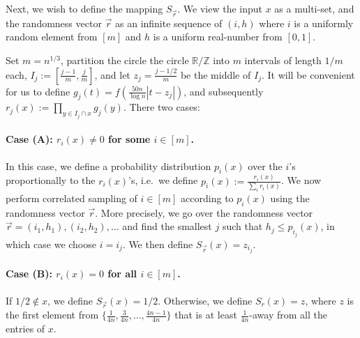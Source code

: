\documentclass[10pt,a4paper]{article}
\newcommand\card[1]{\left| {#1} \right|}
\renewcommand\leq{\leqslant}
\newcommand{\ZZ}{\mathbb{Z}}
\newcommand{\RR}{\mathbb{R}}
\begin{document}
Next, we wish to define the mapping $S_{\vec{r}}$. We view the input $x$ as a multi-set, and
the randomness vector $\vec{r}$ as an infinite sequence of $(i,h)$ where $i$ is a uniformly
random element from $[m]$ and $h$ is a uniform real-number from $[0,1]$.

Set $m = n^{1/3}$, partition the circle
the circle $\RR/\ZZ$ into $m$ intervals of length $1/m$ each, $I_j:= \left[\frac{j-1}{m},\frac{j}{m}\right]$, and
let $z_j = \frac{j-1/2}{m}$ be the middle of $I_j$.
It will be convenient for us to define $g_j(t) = f(\frac{50n}{\log n}\card{t-z_j})$,
and subsequently $r_j(x):= \prod\limits_{y\in I_j\cap x} g_j(y)$.
There two cases:

\paragraph{Case (A): $r_i(x)\neq 0$ for some $i\in [m]$.}
In this case, we define a probability distribution $p_i(x)$ over the $i$'s proportionally to the $r_i(x)$'s, i.e.\
we define $p_i(x):=\frac{r_i(x)}{\sum_i r_i(x)}$. We now perform correlated sampling of $i\in[m]$ according to $p_i(x)$ using the randomness vector $\vec{r}$.
More precisely, we go over the randomness vector $\vec{r} = (i_1,h_1),(i_2,h_2),\ldots$ and find the smallest $j$ such that
$h_j\leq p_{i_j}(x)$, in which case we choose $i = i_j$. We then define $S_{\vec{r}}(x) = z_{i_j}$.


\paragraph{Case (B): $r_i(x) = 0$ for all $i\in [m]$.}
If $1/2\not\in x$, we define $S_{\vec{r}}(x) = 1/2$.
Otherwise, we define $S_r(x)=z$, where $z$ is the first element from $\{\frac{1}{4n}, \frac{3}{4n},\ldots,\frac{4n-1}{4n}\}$ that is at least $\frac{1}{4n}$-away from all the
entries of $x$.
\end{document}
